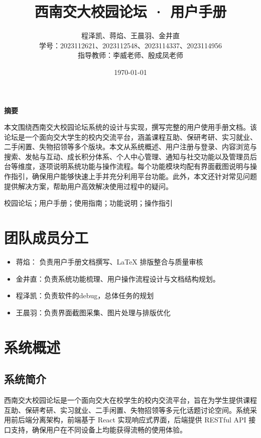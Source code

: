\documentclass[12pt,a4paper]{article}
\title{\textbf{西南交大校园论坛 · 用户手册}}
\author{
	程泽凯、蒋焰、王晨羽、金井直 \\[0.5em]
	学号：2023112621、2023112548、2023114337、2023114956 \\[0.5em]
	指导教师：李威老师、殷成凤老师
}
\date{\today}
\begin{document}
\maketitle
\thispagestyle{empty}
\newpage

\pagestyle{plain}
\begin{center}
    {\bfseries 摘要}
\end{center}

本文围绕西南交大校园论坛系统的设计与实现，撰写完整的用户使用手册文档。该论坛是一个面向交大学生的校内交流平台，涵盖课程互助、保研考研、实习就业、二手闲置、失物招领等多个版块。本文从系统概述、用户注册与登录、内容浏览与搜索、发帖与互动、成长积分体系、个人中心管理、通知与社交功能以及管理员后台等维度，逐项说明系统功能与操作流程。每个功能模块均配有界面截图说明与操作指引，确保用户能够快速上手并充分利用平台功能。此外，本文还针对常见问题提供解决方案，帮助用户高效解决使用过程中的疑问。

\vspace{0.5em}
校园论坛；用户手册；使用指南；功能说明；操作指引

\newpage
\tableofcontents
\newpage
\pagestyle{plain}

\setcounter{page}{1}

\section{团队成员分工}
\begin{itemize}[leftmargin=2em]
	\item 蒋焰：  负责用户手册文档撰写、\LaTeX{} 排版整合与质量审核
    \item 金井直：负责系统功能梳理、用户操作流程设计与文档结构规划。
    \item 程泽凯：负责软件的debug，总体任务的规划
    \item 王晨羽：负责界面截图采集、图片处理与排版优化
\end{itemize}

\section{系统概述}

\subsection{系统简介}
西南交大校园论坛是一个面向交大在校学生的校内交流平台，旨在为学生提供课程互助、保研考研、实习就业、二手闲置、失物招领等多元化话题讨论空间。系统采用前后端分离架构，前端基于 React 实现响应式界面，后端提供 RESTful API 接口支持，确保用户在不同设备上均能获得流畅的使用体验。
\end{document}
